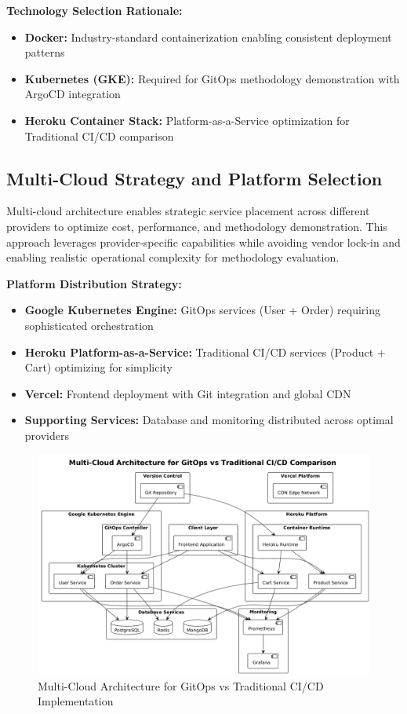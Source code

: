 \textbf{Technology Selection Rationale:}
\begin{itemize}
\item \textbf{Docker:} Industry-standard containerization enabling consistent deployment patterns
\item \textbf{Kubernetes (GKE):} Required for GitOps methodology demonstration with ArgoCD integration
\item \textbf{Heroku Container Stack:} Platform-as-a-Service optimization for Traditional CI/CD comparison
\end{itemize}

\subsection{Multi-Cloud Strategy and Platform Selection}

Multi-cloud architecture enables strategic service placement across different providers to optimize cost, performance, and methodology demonstration. This approach leverages provider-specific capabilities while avoiding vendor lock-in and enabling realistic operational complexity for methodology evaluation.

\textbf{Platform Distribution Strategy:}
\begin{itemize}
\item \textbf{Google Kubernetes Engine:} GitOps services (User + Order) requiring sophisticated orchestration
\item \textbf{Heroku Platform-as-a-Service:} Traditional CI/CD services (Product + Cart) optimizing for simplicity
\item \textbf{Vercel:} Frontend deployment with Git integration and global CDN
\item \textbf{Supporting Services:} Database and monitoring distributed across optimal providers
\end{itemize}

\begin{figure}[H]
\centering
\includegraphics[width=1.0\textwidth]{figures/Multi-Cloud-Architecture-Diagram.png}
\caption{Multi-Cloud Architecture for GitOps vs Traditional CI/CD Implementation}
\label{fig:multi-cloud-architecture}
\end{figure}

